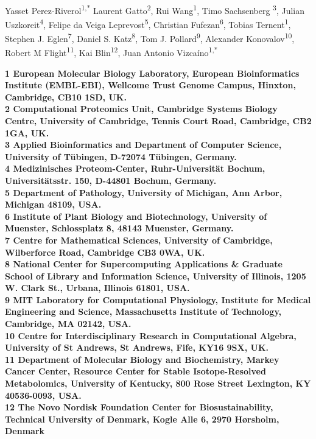 \documentclass[10pt,letterpaper]{article}
\date{}
\begin{document}
\vspace*{0.35in}

\begin{flushleft}
{\Large
\textbf{}
}
\newline
\\

Yasset Perez-Riverol\textsuperscript{1,*}
Laurent Gatto\textsuperscript{2},
Rui Wang\textsuperscript{1}, 
Timo Sachsenberg \textsuperscript{3},
Julian Uszkoreit\textsuperscript{4},
Felipe da Veiga Leprevost\textsuperscript{5},
Christian Fufezan\textsuperscript{6},
Tobias Ternent\textsuperscript{1},
Stephen J. Eglen\textsuperscript{7}, 
Daniel S. Katz\textsuperscript{8}, 
Tom J. Pollard\textsuperscript{9}, 
Alexander Konovalov\textsuperscript{10},
Robert M Flight\textsuperscript{11},
Kai Blin\textsuperscript{12},
Juan Antonio Vizcaíno\textsuperscript{1,*}

\bigskip

\bf{1} European Molecular Biology Laboratory, European Bioinformatics
Institute (EMBL-EBI), Wellcome Trust Genome Campus, Hinxton,
Cambridge, CB10 1SD, UK.
\\
\bf{2} Computational Proteomics Unit, Cambridge Systems Biology
Centre, University of Cambridge, Tennis Court Road, Cambridge, CB2
1GA, UK.
\\
\bf{3} Applied Bioinformatics and Department of Computer Science,
University of Tübingen, D-72074 Tübingen, Germany.
\\
\bf{4} Medizinisches Proteom-Center, Ruhr-Universität Bochum,
Universitätsstr. 150, D-44801 Bochum, Germany.
\\
\bf{5} Department of Pathology, University of Michigan, Ann Arbor,
Michigan 48109, USA.
\\
\bf{6} Institute of Plant Biology and Biotechnology, University of
Muenster, Schlossplatz 8, 48143 Muenster, Germany.
\\
\bf{7} Centre for Mathematical Sciences, University of Cambridge,
Wilberforce Road, Cambridge CB3 0WA, UK.
\\
\bf{8} National Center for Supercomputing Applications \& Graduate
School of Library and Information Science, University of Illinois,
1205 W. Clark St., Urbana, Illinois 61801, USA.
\\
\bf{9} MIT Laboratory for Computational Physiology, Institute for
Medical Engineering and Science, Massachusetts Institute of
Technology, Cambridge, MA 02142, USA.
\\
\bf{10} Centre for Interdisciplinary Research in Computational
Algebra, University of St Andrews, St Andrews, Fife, KY16 9SX, UK.
\\
\bf{11} Department of Molecular Biology and Biochemistry, Markey
Cancer Center, Resource Center for Stable Isotope-Resolved
Metabolomics, University of Kentucky, 800 Rose Street Lexington, KY
40536-0093, USA.
\\
\bf{12} The Novo Nordisk Foundation Center for Biosustainability,
Technical University of Denmark, Kogle Alle 6, 2970 Hørsholm, Denmark


\end{flushleft}
\end{document}
